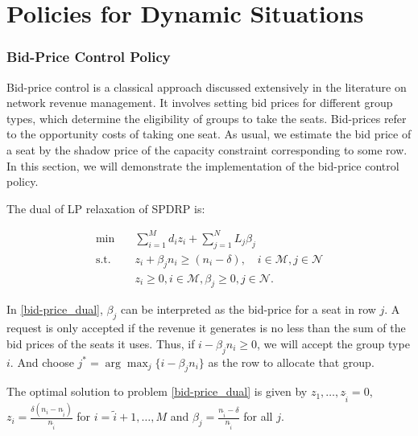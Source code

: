 \newpage

\appendix
\section{Policies for Dynamic Situations}\label{policies}

\subsubsection*{Bid-Price Control Policy}
Bid-price control is a classical approach discussed extensively in the literature on network revenue management. It involves setting bid prices for different group types, which determine the eligibility of groups to take the seats. Bid-prices refer to the opportunity costs of taking one seat. As usual, we estimate the bid price of a seat by the shadow price of the capacity constraint corresponding to some row. In this section, we will demonstrate the implementation of the bid-price control policy. 

The dual of LP relaxation of SPDRP is:

\begin{equation}\label{bid-price_dual}
  \begin{aligned}
  \min \quad & \sum_{i=1}^{M} d_i z_i + \sum_{j= 1}^{N} L_j \beta_{j} \\
  \text {s.t.} \quad & z_{i} + \beta_j n_i \geq (n_i-\delta), \quad i \in \mathcal{M}, j \in \mathcal{N} \\
  & z_{i} \geq 0, i \in \mathcal{M}, \beta_{j} \geq 0, j \in \mathcal{N}.
  \end{aligned}
\end{equation}

In \eqref{bid-price_dual}, $\beta_{j}$ can be interpreted as the bid-price for a seat in row $j$. A request is only accepted if the revenue it generates is no less than the sum of the bid prices of the seats it uses. Thus, if $i -\beta_{j} n_i \geq 0$, we will accept the group type $i$. And choose $j^{*} = \arg \max_{j} \{i -\beta_{j} n_i\}$ as the row to allocate that group.


\begin{lem}\label{bid-price}
 The optimal solution to problem \eqref{bid-price_dual} is given by $z_1 ,\ldots, z_{\tilde{i}} =0$, $z_{i} = \frac{\delta(n_i-n_{\tilde{i}})}{n_{\tilde{i}}}$ for $i = \tilde{i}+1, \ldots, M$ and $\beta_j = \frac{n_{\tilde{i}} - \delta}{n_{\tilde{i}}}$ for all $j$.
\end{lem}

